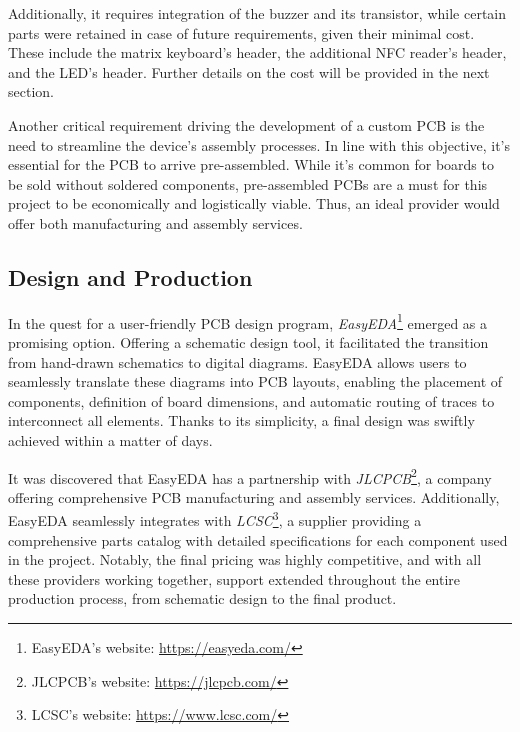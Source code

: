 Additionally, it requires integration of the buzzer and its transistor, while certain parts were retained 
in case of future requirements, given their minimal cost. These include the matrix keyboard's header, the 
additional NFC reader's header, and the LED's header. Further details on the cost will be provided in the 
next section.

Another critical requirement driving the development of a custom PCB is the need to streamline the 
device's assembly processes. In line with this objective, it's essential for the PCB to arrive 
pre-assembled. While it's common for boards to be sold without soldered components, pre-assembled PCBs are 
a must for this project to be economically and logistically viable. Thus, an ideal provider would offer 
both manufacturing and assembly services.


\subsection{Design and Production}

In the quest for a user-friendly PCB design program, \textit{EasyEDA}\footnote{EasyEDA's website: 
\url{https://easyeda.com/}} emerged as a promising option. Offering a schematic design tool, it facilitated 
the transition from hand-drawn schematics to digital diagrams. EasyEDA allows users to seamlessly translate 
these diagrams into PCB layouts, enabling the placement of components, definition of board dimensions, and 
automatic routing of traces to interconnect all elements. Thanks to its simplicity, a final design was 
swiftly achieved within a matter of days.

It was discovered that EasyEDA has a partnership with \textit{JLCPCB}\footnote{JLCPCB's website: 
\url{https://jlcpcb.com/}}, a company offering comprehensive PCB manufacturing and assembly services. 
Additionally, EasyEDA seamlessly integrates with \textit{LCSC}\footnote{LCSC's website: 
\url{https://www.lcsc.com/}}, a supplier providing a comprehensive parts catalog with detailed specifications 
for each component used in the project. Notably, the final pricing was highly competitive, and with all these 
providers working together, support extended throughout the entire production process, from schematic design 
to the final product.

